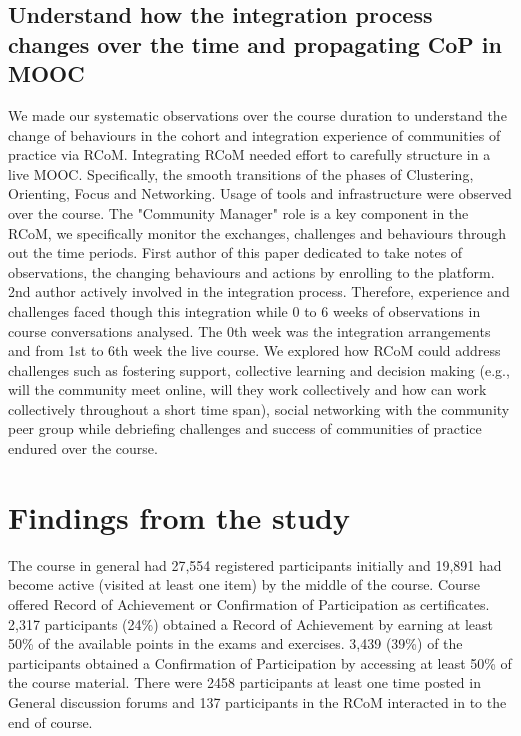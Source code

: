 \documentclass[format=acmsmall, review=false, screen=true]{acmart}
\begin{document}
\subsection{Understand how the integration process changes over the time and propagating CoP in MOOC}
We made our systematic observations over the course duration to understand the change of behaviours in the cohort and integration experience of communities of practice via RCoM. Integrating RCoM needed effort to carefully structure in a live MOOC. Specifically, the smooth transitions of the phases of Clustering, Orienting, Focus and Networking. Usage of tools and infrastructure were observed over the course. The "Community Manager" role is a key component in the RCoM, we specifically monitor the exchanges, challenges and behaviours through out the time periods. First author of this paper dedicated to take notes of observations, the changing behaviours and actions by enrolling to the platform. 2nd author actively involved in the integration process. Therefore, experience and challenges faced though this integration while 0 to 6 weeks of observations in course conversations analysed. The 0th week was the integration arrangements and from 1st to 6th week the live course. We explored how RCoM could address challenges such as fostering support, collective learning and decision making (e.g., will the community meet online, will they work collectively and how can work collectively throughout a short time span), social networking with the community peer group while debriefing challenges and success of communities of practice endured over the course. 

\section{Findings from the study}

The course in general had 27,554 registered participants initially and 19,891 had become active (visited at least one item) by the middle of the course. Course offered Record of Achievement or Confirmation of Participation as certificates. 2,317 participants (24\%) obtained a Record of Achievement by earning at least 50\% of the available points in the exams and exercises. 3,439 (39\%) of the participants obtained a Confirmation of Participation by accessing at least 50\% of the course material. There were 2458 participants at least one time posted in General discussion forums and 137 participants in the RCoM interacted in to the end of course.
\end{document}
